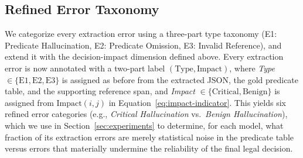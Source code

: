 \subsection{Refined Error Taxonomy}
\label{subsec:taxonomy}
We categorize every extraction error using a three-part type taxonomy (E1: Predicate Hallucination, E2: Predicate Omission, E3: Invalid Reference), and extend it with the decision-impact dimension defined above. Every extraction error is now annotated with a two-part label $(\text{Type}, \text{Impact})$, where \textit{Type} $\in \{\text{E1}, \text{E2}, \text{E3}\}$ is assigned as before from the extracted JSON, the gold predicate table, and the supporting reference span, and \textit{Impact} $\in \{\text{Critical}, \text{Benign}\}$ is assigned from $\mathrm{Impact}(i,j)$ in Equation~\ref{eq:impact-indicator}. This yields six refined error categories (e.g., \textit{Critical Hallucination} vs.\ \textit{Benign Hallucination}), which we use in Section~\ref{sec:experiments} to determine, for each model, what fraction of its extraction errors are merely statistical noise in the predicate table versus errors that materially undermine the reliability of the final legal decision.
